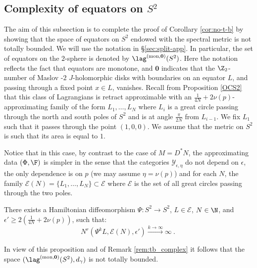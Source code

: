 

\subsection{Complexity of equators on $S{^2}$}\label{subsec:tb_S2}
The aim of this subsection is to complete the proof of Corollary \ref{cor:no-t-b} by showing that the space of equators on $S^{2}$
endowed with the spectral metric is not totally bounded.  We will use the notation in \S\ref{sec:split-app}. In particular,
the set of equators on the $2$-sphere is denoted by
$\lag^{\text{(mon,} \mathbf{0} \text{)}}(S^2)$. Here 
the notation reflects the fact that equators are monotone, and $\mathbf{0}$ indicates that the $\Z_{2}$-number of Maslov -$2$  $J$-holomorphic disks with boundaries on an equator $L$, and passing through a fixed point $x\in L$, vanishes. Recall  from Proposition \ref{OCS2} that this class of Lagrangians
is retract approximable  with an $\frac{1}{4N}+2\nu(p)$-approximating family of the form
$L_{1},\ldots, L_{N}$ where $L_{i}$ is a great circle passing through the north and south poles of $S^{2}$ and is  at angle $\frac{\pi}{2N}$ from $L_{i-1}$. We fix  $L_{1}$ such that it passes through  the point $(1,0,0)$. We assume that the metric
on $S^{2}$ is such that its area is equal to $1$.


Notice that in this case, by contrast to the case of $M=D^{\ast}N$, the approximating data $(\Phi, \F)$ is simpler in the sense
that the categories $\mathscr{Y}_{\epsilon,\eta}$ do not depend
on $\epsilon$, the only dependence is on $p$ (we may assume $\eta=\nu(p)$) and for each $N$, the family $\mathcal{E}(N)=\{L_{1},\ldots, L_{N}\}\subset \mathcal{E}$ where $\mathcal{E}$ is the set of all great circles passing through the two poles.   
\begin{prop} \label{prop:complex_S2}
There exists a Hamiltonian diffeomorphism $\Psi\colon S^{2}\to S^{2}$,  $L\in\mathcal{E}$,   $N\in \N$, and  $\epsilon' \geq  2 (\frac{1}{4N}+2\nu(p))$, such that:
\begin{equation*}
N^{r}(\Psi ^{k}L, \mathcal{E}(N), \epsilon') \stackrel{k\to \infty}{\longrightarrow} \infty~.~
\end{equation*}
\end{prop}
In view of this proposition and of Remark \ref{rem:tb_complex} it follows that the space
$(\lag^{\text{(mon,} \mathbf{0} \text{)}}(S^2), d_{\gamma})$
is not totally bounded.

